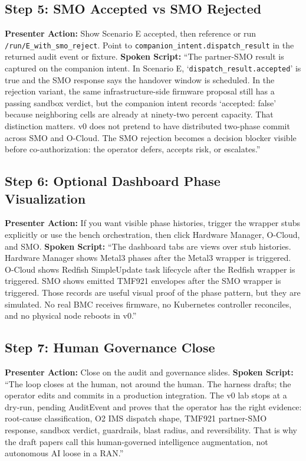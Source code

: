 \documentclass[10pt,a4paper]{article}
\begin{document}
\subsection*{Step 5: SMO Accepted vs SMO Rejected}
\textbf{Presenter Action:} Show Scenario E accepted, then reference or run \texttt{/run/E\_with\_smo\_reject}. Point to \texttt{companion\_intent.dispatch\_result} in the returned audit event or fixture.
\newline\textbf{Spoken Script:}
``The partner-SMO result is captured on the companion intent. In Scenario E, `\texttt{dispatch\_result.accepted}' is true and the SMO response says the handover window is scheduled. In the rejection variant, the same infrastructure-side firmware proposal still has a passing sandbox verdict, but the companion intent records `accepted: false' because neighboring cells are already at ninety-two percent capacity. That distinction matters. v0 does not pretend to have distributed two-phase commit across SMO and O-Cloud. The SMO rejection becomes a decision blocker visible before co-authorization: the operator defers, accepts risk, or escalates.''

\subsection*{Step 6: Optional Dashboard Phase Visualization}
\textbf{Presenter Action:} If you want visible phase histories, trigger the wrapper stubs explicitly or use the bench orchestration, then click Hardware Manager, O-Cloud, and SMO.
\newline\textbf{Spoken Script:}
``The dashboard tabs are views over stub histories. Hardware Manager shows Metal3 phases after the Metal3 wrapper is triggered. O-Cloud shows Redfish SimpleUpdate task lifecycle after the Redfish wrapper is triggered. SMO shows emitted TMF921 envelopes after the SMO wrapper is triggered. Those records are useful visual proof of the phase pattern, but they are simulated. No real BMC receives firmware, no Kubernetes controller reconciles, and no physical node reboots in v0.''

\subsection*{Step 7: Human Governance Close}
\textbf{Presenter Action:} Close on the audit and governance slides.
\newline\textbf{Spoken Script:}
``The loop closes at the human, not around the human. The harness drafts; the operator edits and commits in a production integration. The v0 lab stops at a dry-run, pending AuditEvent and proves that the operator has the right evidence: root-cause classification, O2 IMS dispatch shape, TMF921 partner-SMO response, sandbox verdict, guardrails, blast radius, and reversibility. That is why the draft papers call this human-governed intelligence augmentation, not autonomous AI loose in a RAN.''
\end{document}
